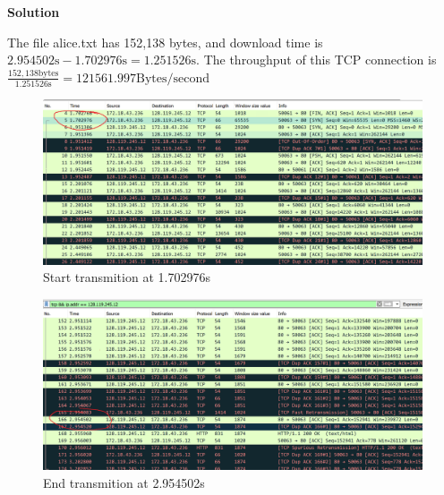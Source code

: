 \documentclass[12pt,letterpaper]{ctexart}
\begin{document}
{\bf Solution}

The file alice.txt has 152,138 bytes, and download time is $2.954502\text{s} - 1.702976\text{s} = 1.251526\text{s}$.
The throughput of this TCP connection is $\frac{152,138\text{bytes}}{1.251526\text{s}} = 121561.997\text{Bytes/second}$

\begin{figure}[H]
  \centering
  \includegraphics[width=\linewidth]{assets/transmit_1.png}
  \caption{Start transmition at 1.702976s}
  \label{fig:transmit_1}
\end{figure}

\begin{figure}[H]
  \centering
  \includegraphics[width=\linewidth]{assets/transmit_2.png}
  \caption{End transmition at 2.954502s}
  \label{fig:transmit_2}
\end{figure}
\end{document}
